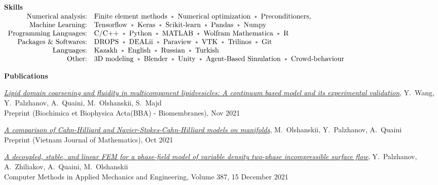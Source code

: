 \documentclass[10pt,letterpaper]{letter}
\newcommand{\gbullet}{\textcolor{gray}{\textbullet} }
\begin{document}
\textbf{Skills}\\
$\begin{array}{r l }
	\text{Numerical analysis:} & \text{Finite element methods \gbullet Numerical optimization \gbullet Preconditioners, } \\
	\text{Machine Learning:} & \text{Tensorflow \gbullet Keras \gbullet Scikit-learn \gbullet Pandas \gbullet Numpy} \\
	\text{Programming Languages:} & \text{C/C++ \gbullet Python \gbullet MATLAB \gbullet Wolfram Mathematica \gbullet R} \\
	\text{Packages \& Softwares:} & \text{DROPS \gbullet DEALii \gbullet Paraview \gbullet VTK \gbullet Trilinos \gbullet Git} \\
	\text{Languages:} & \text{Kazakh \gbullet English \gbullet Russian \gbullet Turkish} \\
	\text{Other:} & \text{3D modeling \gbullet Blender \gbullet Unity \gbullet Agent‑Based Simulation \gbullet Crowd‑behaviour}
\end{array}$



\newpage
\textbf{Publications}
\begin{etaremune}
	\item \textit{\href{https://arxiv.org/abs/2111.03022}{Lipid domain coarsening and fluidity in multicomponent lipidvesicles: A continuum based model and its experimental validation}}, Y.~Wang, Y.~Palzhanov, A.~Quaini, M.~Olshanskii, S.~Majd\\
	Preprint (Biochimica et Biophysica Acta(BBA) - Biomembranes), Nov 2021	
	\item \textit{\href{https://arxiv.org/abs/2110.15873}{A comparison of Cahn-Hilliard and Navier-Stokes-Cahn-Hilliard models on manifolds}}, M.~Olshanskii, Y.~Palzhanov, A.~Quaini \\
	Preprint (Vietnam Journal of Mathematics), Oct 2021	
	\item \textit{\href{https://www.sciencedirect.com/science/article/abs/pii/S0045782521004989}{A decoupled, stable, and linear FEM for a phase-field model of variable density two-phase incompressible surface flow}}, Y.~Palzhanov, A.~Zhiliakov, A.~Quaini, M.~Olshanskii\\
	Computer Methods in Applied Mechanics and Engineering, Volume 387, 15 December 2021
\end{etaremune}
\end{document}
